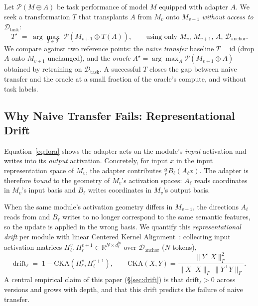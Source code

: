 Let $\mathcal{P}(M \oplus A)$ be task performance of model $M$ equipped with
adapter $A$. We seek a transformation $T$ that transplants $A$ from $M_v$ onto
$M_{v+1}$ \emph{without access to $\mathcal{D}_{\mathrm{task}}$}:
\begin{equation}
  T^\star \;=\;
  \arg\max_{T \in \mathcal{T}}\;
  \mathcal{P}\!\left(M_{v+1} \oplus T(A)\right),
  \qquad
  \text{using only } M_v,\, M_{v+1},\, A,\, \mathcal{D}_{\mathrm{anchor}}.
\label{eq:objective}
\end{equation}
We compare against two reference points: the \emph{naive transfer} baseline
$T = \mathrm{id}$ (drop $A$ onto $M_{v+1}$ unchanged), and the \emph{oracle}
$A^\star = \arg\max_A \mathcal{P}(M_{v+1}\oplus A)$ obtained by retraining on
$\mathcal{D}_{\mathrm{task}}$. A successful $T$ closes the gap between naive
transfer and the oracle at a small fraction of the oracle's compute, and
without task labels.

\subsection{Why Naive Transfer Fails: Representational Drift}

Equation~\eqref{eq:lora} shows the adapter acts on the module's \emph{input}
activation and writes into its \emph{output} activation. Concretely, for input
$x$ in the input representation space of $M_v$, the adapter contributes
$\tfrac{\alpha}{r} B_\ell (A_\ell x)$. The adapter is therefore \emph{bound}
to the geometry of $M_v$'s activation spaces: $A_\ell$ reads coordinates in
$M_v$'s input basis and $B_\ell$ writes coordinates in $M_v$'s output basis.

When the same module's activation geometry differs in $M_{v+1}$, the directions
$A_\ell$ reads from and $B_\ell$ writes to no longer correspond to the same
semantic features, so the update is applied in the wrong basis. We quantify
this \emph{representational drift} per module with linear Centered Kernel
Alignment~\citep{kornblith2019cka}: collecting input activation matrices
$H^{v}_\ell, H^{v+1}_\ell \in \mathbb{R}^{N \times d^{\mathrm{in}}_\ell}$ over
$\mathcal{D}_{\mathrm{anchor}}$ ($N$ tokens),
\begin{equation}
  \mathrm{drift}_\ell \;=\; 1 - \mathrm{CKA}\!\left(H^{v}_\ell, H^{v+1}_\ell\right),
  \qquad
  \mathrm{CKA}(X,Y) = \frac{\lVert Y^\top X \rVert_F^2}
       {\lVert X^\top X \rVert_F \,\lVert Y^\top Y \rVert_F}.
\label{eq:cka}
\end{equation}
A central empirical claim of this paper (\S\ref{sec:drift}) is that
$\mathrm{drift}_\ell > 0$ across versions and grows with depth, and that this
drift predicts the failure of naive transfer.

